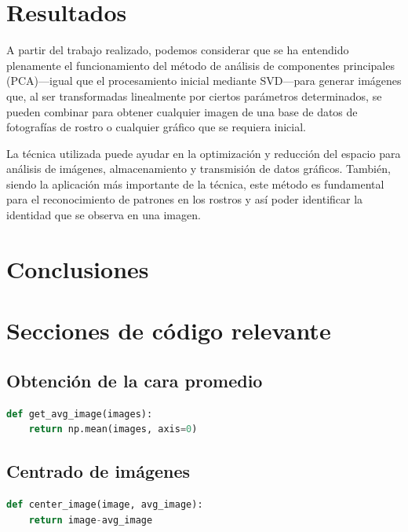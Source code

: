 \documentclass[conference]{IEEEtran}
\begin{document}
\section{Resultados}

A partir del trabajo realizado, podemos considerar que se ha entendido plenamente el funcionamiento del método de análisis de componentes principales (PCA)---igual que el procesamiento inicial mediante SVD---para generar imágenes que, al ser transformadas linealmente por ciertos parámetros determinados, se pueden combinar para obtener cualquier imagen de una base de datos de fotografías de rostro o cualquier gráfico que se requiera inicial.

La técnica utilizada puede ayudar en la optimización y reducción del espacio para análisis de imágenes, almacenamiento y transmisión de datos gráficos. También, siendo la aplicación más importante de la técnica, este método es fundamental para el reconocimiento de patrones en los rostros y así poder identificar la identidad que se observa en una imagen.

\section{Conclusiones}


\section{Secciones de código relevante}

\subsection{Obtención de la cara promedio}
\begin{lstlisting}[language=python]
def get_avg_image(images): 
    return np.mean(images, axis=0)\end{lstlisting}
    
\subsection{Centrado de imágenes}
\begin{lstlisting}[language=python]
def center_image(image, avg_image):
    return image-avg_image\end{lstlisting}
    
\end{document}
